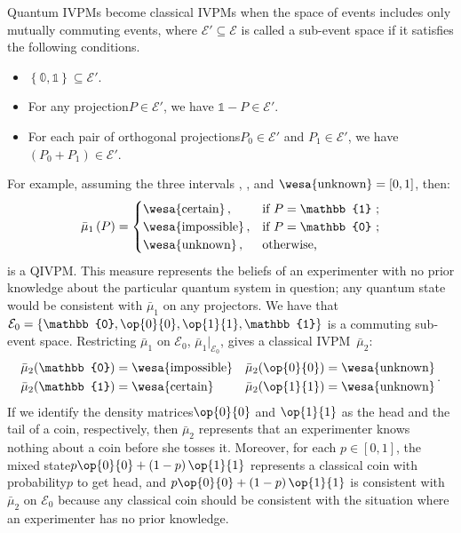 \documentclass[english,reprint, aps, prl,superscriptaddress, showpacs,
showkeys, longbibliography, amsmath, amssymb]{revtex4-1}
\theoremstyle{plain}
\theoremstyle{definition}
\newcommand{\events}{\ensuremath{\mathcal{E}}}
\newcommand{\imposs}{{\text{\wesa{impossible}}}}
\newcommand{\necess}{{\text{\wesa{certain}}}}
\newcommand{\unknown}{{\text{\wesa{unknown}}}}
\newcommand{\proj}[1]{\op{#1}{#1}}
\newcommand{\nb}{\nolinebreak[1] }
\begin{document}
Quantum IVPMs become classical IVPMs when the space of events includes
only mutually commuting events, where $\events'\subseteq\events$
is called a sub-event space if it satisfies the following conditions.
\begin{itemize}
\item $\left\{ \mathbb{0},\mathbb{1}\right\} \subseteq\events'$.
\item For any projection\nb$P\in\events'$, we have $\mathbb{1}-P\in\events'$. 
\item For each pair of orthogonal projections\nb$P_0 \in \events'$ and
  $P_1 \in \events'$, we have $(P_0 + P_1) \in \events'$. 
\end{itemize}

For example, assuming the three intervals \imposs, \necess, and
$\unknown=\left[0,1\right]$, then:
\begin{equation}
\bar{\mu}_{1}\left(P\right)=\begin{cases}
\necess\,, & \text{if }P=\mathbb{1}\text{ ;}\\
\imposs\,, & \text{if }P=\mathbb{0}\text{ ;}\\
\unknown\,, & \text{otherwise,}
\end{cases}\label{eq:no-information-IVPM}
\end{equation}
is a QIVPM. This measure represents the beliefs of an experimenter
with no prior knowledge about the particular quantum system in
question; any quantum state would be consistent with $\bar{\mu}_{1}$
on any projectors. We have that
$\events_{0}=\left\{ \mathbb{0},\proj{0},\proj{1},\mathbb{1}\right\} $
is a commuting sub-event space. Restricting $\bar{\mu}_{1}$ on
$\events_{0}$, $\bar{\mu}_{1}|_{\events_{0}}$, gives a classical
IVPM~$\bar{\mu}_{2}$:
\begin{equation}
\begin{aligned}\bar{\mu}_{2}(\mathbb{0}) & =\imposs & \bar{\mu}_{2}(\proj{0}) & =\unknown\\
\bar{\mu}_{2}(\mathbb{1}) & =\necess & \bar{\mu}_{2}(\proj{1}) & =\unknown
\end{aligned}
\,.
\end{equation}
If we identify the density matrices\nb$\proj{0}$ and $\proj{1}$ as
the head and the tail of a coin, respectively, then $\bar{\mu}_{2}$
represents that an experimenter knows nothing about a coin before
she tosses it. Moreover, for each $p\in\left[0,1\right]$, the mixed
state\nb$p\proj{0}+\left(1-p\right)\proj{1}$ represents a classical
coin with probability\nb$p$ to get head, and $p\proj{0}+\left(1-p\right)\proj{1}$
is consistent with $\bar{\mu}_{2}$ on $\events_{0}$ because any
classical coin should be consistent with the situation where an experimenter
has no prior knowledge.
\end{document}
